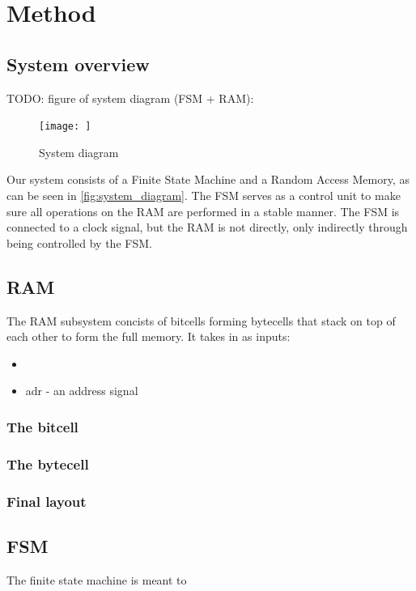 \section{Method}
\subsection{System overview}

TODO: figure of system diagram (FSM + RAM):
\begin{figure}
    \centering
    \texttt{[image: ]}
    \caption{System diagram}
    \label{fig:03:system_diagram}
\end{figure}

Our system consists of a Finite State Machine and a Random Access Memory, as can be seen in \ref{fig:system_diagram}. The FSM serves as a control unit to make sure all operations on the RAM are performed in a stable manner. The FSM is connected to a clock signal, but the RAM is not directly, only indirectly through being controlled by the FSM.

\subsection{RAM}
The RAM subsystem concists of bitcells forming bytecells that stack on top of each other to form the full memory. It takes in as inputs:
\begin{itemize}
    \item 
    \item adr - an address signal
\end{itemize}

\subsubsection{The bitcell}

\subsubsection{The bytecell}

\subsubsection{Final layout}


\subsection{FSM}
The finite state machine is meant to 

